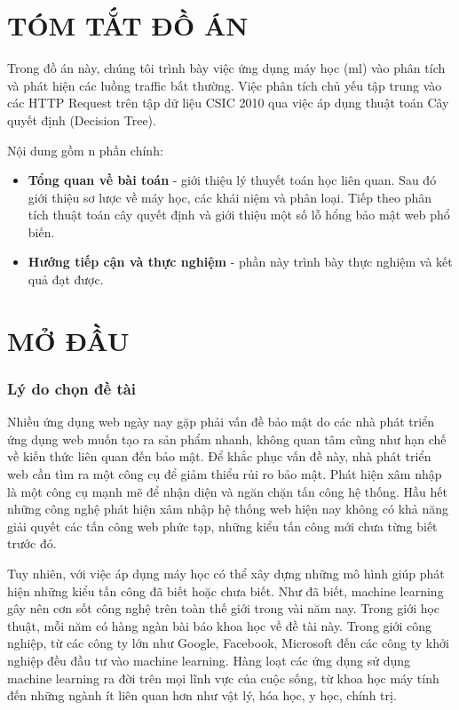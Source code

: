 \documentclass[../main-report.tex]{subfiles}
\begin{document}
\part*{TÓM TẮT ĐỒ ÁN}
Trong đồ án này, chúng tôi trình bày việc ứng dụng máy học (\Gls{ml}) vào phân tích và phát hiện các luồng traffic bất thường.
Việc phân tích chủ yếu tập trung vào các HTTP Request trên tập dữ liệu CSIC 2010 qua việc áp dụng thuật toán Cây quyết định (Decision Tree).

Nội dung gồm n phần chính:

\begin{itemize}
\item \textbf{Tổng quan về bài toán} - giới thiệu lý thuyết toán học liên quan. Sau đó giới thiệu sơ lược về máy học, các khái niệm và phân loại. Tiếp theo phân tích thuật toán cây quyết định và giới thiệu một số lỗ hổng bảo mật web phổ biến.
\item \textbf{Hướng tiếp cận và thực nghiệm} - phần này trình bày thực nghiệm và kết quả đạt được.
\end{itemize}

\newpage
\part*{MỞ ĐẦU}
\section*{Lý do chọn đề tài}
Nhiều ứng dụng web ngày nay gặp phải vấn đề bảo mật do các nhà phát triển ứng dụng web muốn tạo ra sản phẩm nhanh, không quan tâm cũng như hạn chế về kiến thức liên quan đến bảo mật. Để khắc phục vấn đề này, nhà phát triển web cần tìm ra một công cụ để giảm thiểu rủi ro bảo mật. Phát hiện xâm nhập là một công cụ mạnh mẽ để nhận diện và ngăn chặn tấn công hệ thống. Hầu hết những công nghệ phát hiện xâm nhập hệ thống web hiện nay không có khả năng giải quyết các tấn công web phức tạp, những kiểu tấn công mới chưa từng biết trước đó.

Tuy nhiên, với việc áp dụng máy học có thể xây dựng những mô hình giúp phát hiện những kiểu tấn công đã biết hoặc chưa biết. Như đã biết, machine learning gây nên cơn sốt công nghệ trên toàn thế giới trong vài năm nay. Trong giới học thuật, mỗi năm có hàng ngàn bài báo khoa học về đề tài này. Trong giới công nghiệp, từ các công ty lớn như Google, Facebook, Microsoft đến các công ty khởi nghiệp đều đầu tư vào machine learning. Hàng loạt các ứng dụng sử dụng machine learning ra đời trên mọi lĩnh vực của cuộc sống, từ khoa học máy tính đến những ngành ít liên quan hơn như vật lý, hóa học, y học, chính trị.
\end{document}
